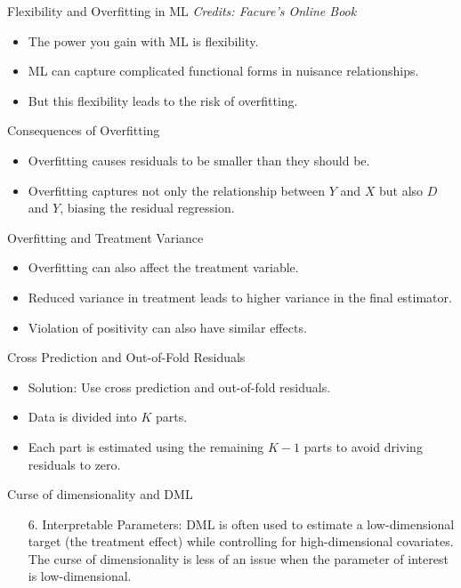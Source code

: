 \documentclass{beamer}
\begin{document}
\begin{frame}{Flexibility and Overfitting in ML}
  \textit{Credits: Facure's Online Book}
  \begin{itemize}
    \item The power you gain with ML is flexibility.
    \item ML can capture complicated functional forms in nuisance relationships.
    \item But this flexibility leads to the risk of overfitting.
  \end{itemize}
\end{frame}

\begin{frame}{Consequences of Overfitting}
  \begin{itemize}
    \item Overfitting causes residuals to be smaller than they should be.
    \item Overfitting captures not only the relationship between \( Y \) and \( X \) but also \( D \) and \( Y \), biasing the residual regression.
  \end{itemize}
\end{frame}

\begin{frame}{Overfitting and Treatment Variance}
  \begin{itemize}
    \item Overfitting can also affect the treatment variable.
    \item Reduced variance in treatment leads to higher variance in the final estimator.
    \item Violation of positivity can also have similar effects.
  \end{itemize}
\end{frame}

\begin{frame}{Cross Prediction and Out-of-Fold Residuals}
  \begin{itemize}
    \item Solution: Use cross prediction and out-of-fold residuals.
    \item Data is divided into \( K \) parts.
    \item Each part is estimated using the remaining \( K-1 \) parts to avoid driving residuals to zero.
  \end{itemize}
\end{frame}

\begin{frame}{Curse of dimensionality and DML}


\begin{enumerate}



\item[6. ]Interpretable Parameters: DML is often used to estimate a low-dimensional target (the treatment effect) while controlling for high-dimensional covariates. The curse of dimensionality is less of an issue when the parameter of interest is low-dimensional.

\end{enumerate}

\end{frame}
\end{document}
